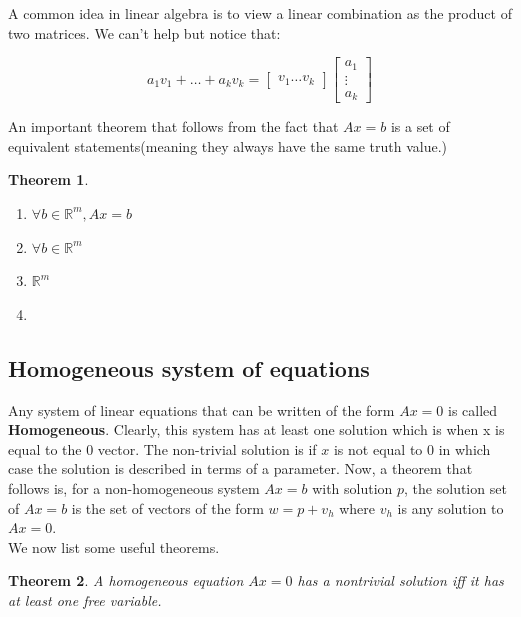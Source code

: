 \documentclass{article}
\newtheorem{thm}{Theorem}[subsection]
\begin{document}
A common idea in linear algebra is to view a linear combination as the product of two matrices. We can't help but notice that:

\begin{equation*}
    a_{1}v_{1} + \ldots + a_{k}v_{k} = \begin{bmatrix}
        v_{1}  \ldots v_{k}
    \end{bmatrix} \begin{bmatrix}
        a_{1} \\
        \vdots \\
        a_{k}
    \end{bmatrix}
\end{equation*}

An important theorem that follows from the fact that $Ax=b$ is a set of equivalent statements(meaning they always have the same truth value.) 

\begin{thm}
\begin{enumerate}
    \item $\forall b \in \mathbb{R}^{m}, Ax=b$ 
    \item $ \forall b \in \mathbb{R}^{m}$ 
    \item {} $\mathbb{R}^{m}$
    \item {}
\end{enumerate}
\end{thm}

\subsection{Homogeneous system of equations}

Any system of linear equations that can be written of the form $Ax = 0$ is called \textbf{Homogeneous}. Clearly, this system has at least one solution which is when x is equal to the 0 vector. The non-trivial solution is if $x$ is not equal to 0 in which case the solution is described in terms of a parameter. Now, a theorem that follows is, for a non-homogeneous system $Ax=b$ with solution $p$, the solution set of $Ax=b$ is the set of vectors of the form $w = p + v_{h}$ where $v_{h}$ is any solution to $Ax = 0$.
\\ We now list some useful theorems. 
\begin{thm}
A homogeneous equation $Ax = 0$ has a nontrivial solution iff it has at least one free variable.
\end{thm}
\end{document}
